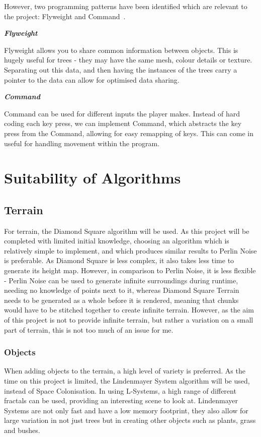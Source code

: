 \documentclass[a4paper,10pt]{report}
\begin{document}
However, two programming patterns have been identified which are relevant to the project: Flyweight and Command~\cite{nystrom2014game}.\medskip

\emph{\textbf{Flyweight}}\medskip

Flyweight allows you to share common information between objects. This is hugely useful for trees - they may have the same mesh, colour details or texture. Separating out this data, and then having the instances of the trees carry a pointer to the data can allow for optimised data sharing. \medskip

\emph{\textbf{Command}}\medskip

Command can be used for different inputs the player makes. Instead of hard coding each key press, we can implement Command, which abstracts the key press from the Command, allowing for easy remapping of keys. This can come in useful for handling movement within the program. 

\section{Suitability of Algorithms}

\subsection{Terrain}

For terrain, the Diamond Square algorithm will be used. As this project will be completed with limited initial knowledge, choosing an algorithm which is relatively simple to implement, and which produces similar results to Perlin Noise is preferable. As Diamond Square is less complex, it also takes less time to generate its height map. However, in comparison to Perlin Noise, it is less flexible - Perlin Noise can be used to generate infinite surroundings during runtime, needing no knowledge of points next to it, whereas Diamond Square Terrain needs to be generated as a whole before it is rendered, meaning that chunks would have to be stitched together to create infinite terrain. However, as the aim of this project is not to provide infinite terrain, but rather a variation on a small part of terrain, this is not too much of an issue for me. 

\subsubsection{Objects}

When adding objects to the terrain, a high level of variety is preferred. As the time on this project is limited, the Lindenmayer System algorithm will be used, instead of Space Colonisation. In using L-Systems, a high range of different fractals can be used, providing an interesting scene to look at. Lindenmayer Systems are not only fast and have a low memory footprint, they also allow for large variation in not just trees but in creating other objects such as plants, grass and bushes. 
\end{document}
